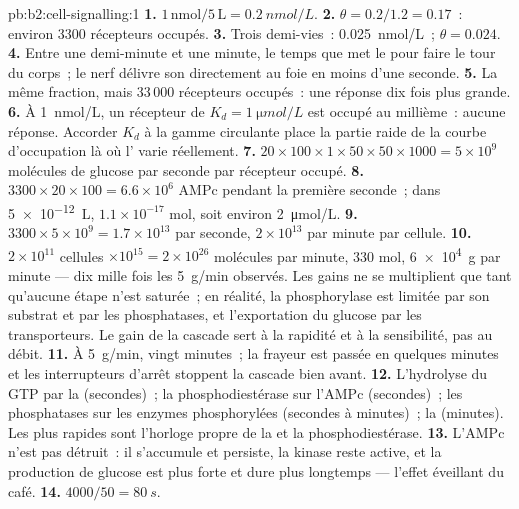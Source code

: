 \begin{solution}{pb:b2:cell-signalling:1}
\textbf{1.} $1\,\text{nmol}/5\,\text{L} = \qty{0.2}{nmol/L}$.
\textbf{2.} $\theta = 0.2/1.2 = 0.17$~: environ 3300 récepteurs occupés.
\textbf{3.} Trois demi-vies~: \qty{0.025}{nmol/L}~; $\theta = 0.024$.
\textbf{4.} Entre une demi-minute et une minute, le temps que met le
 pour faire le tour du corps~; le nerf délivre son 
directement au foie en moins d'une seconde.
\textbf{5.} La même fraction, mais $33\,000$ récepteurs occupés~: une
réponse dix fois plus grande.
\textbf{6.} À \qty{1}{nmol/L}, un récepteur de $K_d = \qty{1}{\micro
mol/L}$ est occupé au millième~: aucune réponse. Accorder $K_d$ à la
gamme circulante place la partie raide de la courbe d'occupation là où
l' varie réellement.
\textbf{7.} $20\times 100\times 1\times 50\times 50\times 1000 =
5\times 10^{9}$ molécules de glucose par seconde par récepteur occupé.
\textbf{8.} $3300\times 20\times 100 = 6.6\times 10^{6}$ AMPc pendant
la première seconde~; dans \qty{5e-12}{L}, $1.1\times 10^{-17}$ mol,
soit environ \qty{2}{\micro mol/L}.
\textbf{9.} $3300\times 5\times 10^{9} = 1.7\times 10^{13}$ par seconde, $2\times
10^{13}$ par minute par cellule.
\textbf{10.} $2\times 10^{11}$ cellules $\times 10^{15} = 2\times
10^{26}$ molécules par minute, 330 mol, \qty{6e4}{g} par minute ---
dix mille fois les \qty{5}{g/min} observés. Les gains ne se multiplient
que tant qu'aucune étape n'est saturée~; en réalité, la phosphorylase est
limitée par son substrat et par les phosphatases, et l'exportation du
glucose par les transporteurs. Le gain de la cascade sert à la rapidité
et à la sensibilité, pas au débit.
\textbf{11.} À \qty{5}{g/min}, vingt minutes~; la frayeur est passée en
quelques minutes et les interrupteurs d'arrêt stoppent la cascade bien
avant.
\textbf{12.} L'hydrolyse du GTP par la  (secondes)~; la
phosphodiestérase sur l'AMPc (secondes)~; les phosphatases sur les
enzymes phosphorylées (secondes à minutes)~; la  (minutes). Les plus rapides sont l'horloge propre de la
 et la phosphodiestérase.
\textbf{13.} L'AMPc n'est pas détruit~: il s'accumule et persiste, la
kinase reste active, et la production de glucose est plus forte et dure
plus longtemps --- l'effet éveillant du café.
\textbf{14.} $4000/50 = \qty{80}{s}$.

\end{solution}
